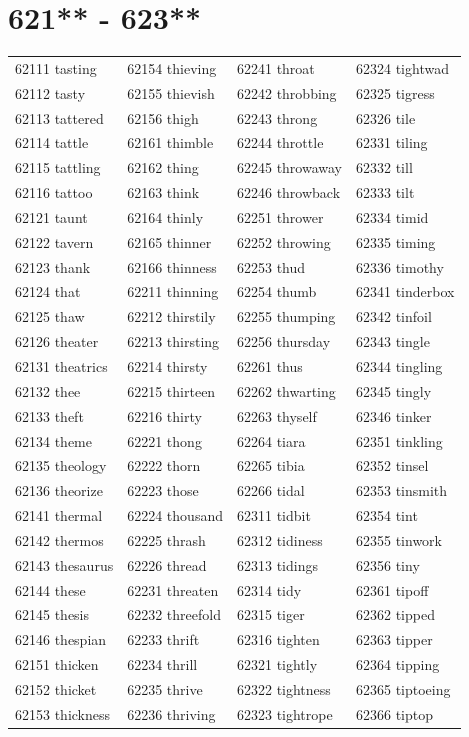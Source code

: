 \documentclass[10pt, oneside]{book}
\begin{document}
\begin{table}
	\centering
	\section*{621** - 623**}
	\begin{tabular}{l l l l}
62111 tasting &62154 thieving &62241 throat &62324 tightwad\\
62112 tasty &62155 thievish &62242 throbbing &62325 tigress\\
62113 tattered &62156 thigh &62243 throng &62326 tile\\
62114 tattle &62161 thimble &62244 throttle &62331 tiling\\
62115 tattling &62162 thing &62245 throwaway &62332 till\\
62116 tattoo &62163 think &62246 throwback &62333 tilt\\
62121 taunt &62164 thinly &62251 thrower &62334 timid\\
62122 tavern &62165 thinner &62252 throwing &62335 timing\\
62123 thank &62166 thinness &62253 thud &62336 timothy\\
62124 that &62211 thinning &62254 thumb &62341 tinderbox\\
62125 thaw &62212 thirstily &62255 thumping &62342 tinfoil\\
62126 theater &62213 thirsting &62256 thursday &62343 tingle\\
62131 theatrics &62214 thirsty &62261 thus &62344 tingling\\
62132 thee &62215 thirteen &62262 thwarting &62345 tingly\\
62133 theft &62216 thirty &62263 thyself &62346 tinker\\
62134 theme &62221 thong &62264 tiara &62351 tinkling\\
62135 theology &62222 thorn &62265 tibia &62352 tinsel\\
62136 theorize &62223 those &62266 tidal &62353 tinsmith\\
62141 thermal &62224 thousand &62311 tidbit &62354 tint\\
62142 thermos &62225 thrash &62312 tidiness &62355 tinwork\\
62143 thesaurus &62226 thread &62313 tidings &62356 tiny\\
62144 these &62231 threaten &62314 tidy &62361 tipoff\\
62145 thesis &62232 threefold &62315 tiger &62362 tipped\\
62146 thespian &62233 thrift &62316 tighten &62363 tipper\\
62151 thicken &62234 thrill &62321 tightly &62364 tipping\\
62152 thicket &62235 thrive &62322 tightness &62365 tiptoeing\\
62153 thickness &62236 thriving &62323 tightrope &62366 tiptop\\
	\end{tabular}
 \end{table}
\clearpage
\end{document}
